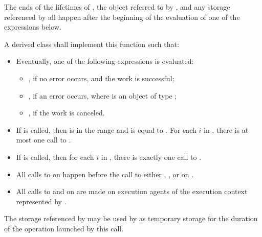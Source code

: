 \begin{itemdescr}
\pnum
\expects
The ends of
the lifetimes of ,
the object referred to by , and
any storage referenced by 
all happen after
the beginning of the evaluation of one of the expressions below.

\pnum
\effects
A derived class shall implement this function such that:
\begin{itemize}
\item
Eventually, one of the following expressions is evaluated:
\begin{itemize}
\item
{}, if no error occurs, and the work is successful;
\item
{}, if an error occurs,
where  is an object of type ;
\item
{}, if the work is canceled.
\end{itemize}
\item
If  is called,
then  is in the range  and
 is equal to .
For each $i$ in ,
there is at most one call to .
\item
If  is called,
then for each $i$ in ,
there is exactly one call to .
\item
All calls to  on  happen before
the call to either , , or 
on .
\item
All calls to  and  on  are made
on execution agents of the execution context represented by .
\end{itemize}

\pnum
\remarks
The storage referenced by  may be used by 
as temporary storage for the duration of the operation launched by this call.
\end{itemdescr}
